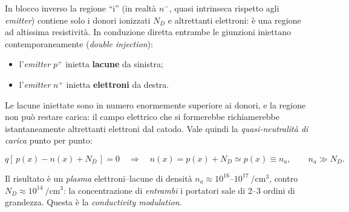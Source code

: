 In blocco inverso la regione ``i'' (in realtà $n^{-}$, quasi intrinseca rispetto
agli \emph{emitter}) contiene solo i donori ionizzati $N_D$ e altrettanti
elettroni: è una regione ad altissima resistività. In conduzione diretta
entrambe le giunzioni iniettano contemporaneamente
(\emph{double injection}):

\begin{itemize}
\item l'\emph{emitter} $p^{+}$ inietta \textbf{lacune} da sinistra;
\item l'\emph{emitter} $n^{+}$ inietta \textbf{elettroni} da destra.
\end{itemize}

Le lacune iniettate sono in numero enormemente superiore ai donori, e la
regione non può restare carica: il campo elettrico che si formerebbe richiamerebbe
istantaneamente altrettanti elettroni dal catodo. Vale quindi la
\emph{quasi-neutralità di carica} punto per punto:

\begin{equation}
q\left[\,p(x) - n(x) + N_D\,\right] = 0
\quad\Longrightarrow\quad
n(x) = p(x) + N_D \simeq p(x) \equiv n_a ,
\qquad n_a \gg N_D .
\label{pindiode:eq:neutralita}
\end{equation}

Il risultato è un \emph{plasma} elettroni--lacune di densità
$n_a \approx 10^{16}$--$10^{17}\ \si{\per\centi\meter\cubed}$, contro
$N_D \approx 10^{14}\ \si{\per\centi\meter\cubed}$: la concentrazione di
\emph{entrambi} i portatori sale di 2--3 ordini di grandezza. Questa è la
\emph{conductivity modulation}.

